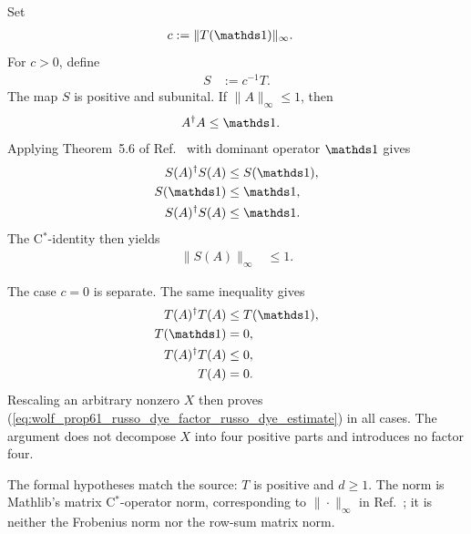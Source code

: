 \documentclass{article}
\begin{document}
Set
\begin{align}
    c
        &:=\|T(\Id)\|_\infty.
    \label{eq:wolf_prop61_russo_dye_factor_normalization_constant}
\end{align}
For $c>0$, define
\begin{align}
    S
        &:=c^{-1}T.
    \label{eq:wolf_prop61_russo_dye_factor_normalized_map}
\end{align}
The map $S$ is positive and subunital. If $\|A\|_\infty\leq1$, then
\begin{align}
    A^\dagger A
        &\leq\Id.
    \label{eq:wolf_prop61_russo_dye_factor_unit_ball_order}
\end{align}
Applying Theorem~5.6 of Ref.~\cite{Wolf2012Quantum} with dominant operator
$\Id$ gives
\begin{align}
    S(A)^\dagger S(A)
        &\leq S(\Id),
    \label{eq:wolf_prop61_russo_dye_factor_schwarz_first_bound}\\
    S(\Id)
        &\leq\Id,
    \label{eq:wolf_prop61_russo_dye_factor_subunital_bound}\\
    S(A)^\dagger S(A)
        &\leq\Id.
    \label{eq:wolf_prop61_russo_dye_factor_schwarz_unit_bound}
\end{align}
The C$^*$-identity then yields
\begin{align}
    \|S(A)\|_\infty
        &\leq1.
    \label{eq:wolf_prop61_russo_dye_factor_normalized_contraction}
\end{align}

The case $c=0$ is separate. The same inequality gives
\begin{align}
    T(A)^\dagger T(A)
        &\leq T(\Id),
    \label{eq:wolf_prop61_russo_dye_factor_zero_case_schwarz}\\
    T(\Id)
        &=0,
    \label{eq:wolf_prop61_russo_dye_factor_zero_case_identity}\\
    T(A)^\dagger T(A)
        &\leq0,
    \label{eq:wolf_prop61_russo_dye_factor_zero_case_nonpositive_square}\\
    T(A)
        &=0.
    \label{eq:wolf_prop61_russo_dye_factor_zero_case_map_value}
\end{align}
Rescaling an arbitrary nonzero $X$ then proves
(\ref{eq:wolf_prop61_russo_dye_factor_russo_dye_estimate}) in all cases.
The argument does not decompose $X$ into four positive parts and introduces
no factor four.

The formal hypotheses match the source: $T$ is positive and $d\geq1$. The
norm is Mathlib's matrix C$^*$-operator norm, corresponding to
$\|\cdot\|_\infty$ in Ref.~\cite{Wolf2012Quantum}; it is neither the
Frobenius norm nor the row-sum matrix norm.
\end{document}
